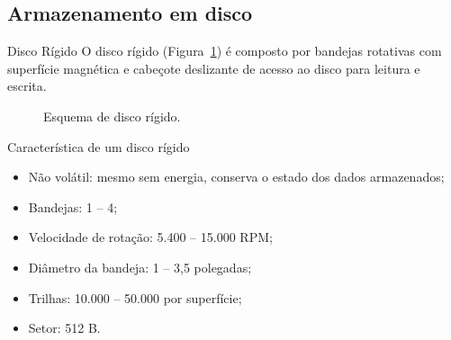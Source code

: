 

\subsection{Armazenamento em disco}

\begin{frame}{Disco Rígido}
O disco rígido (Figura~\ref{fig:hd}) é composto por bandejas rotativas
com superfície magnética e cabeçote deslizante de acesso ao disco para
leitura e escrita.

  \begin{figure}[h]
  \centering

\label{fig:hd}
\caption{Esquema de disco rígido.}
\end{figure}
\end{frame}

\begin{frame}{Característica de um disco rígido}
\begin{itemize}
\item Não volátil: mesmo sem energia, conserva o estado dos dados armazenados;
\item Bandejas: 1 -- 4;
\item Velocidade de rotação: 5.400 -- 15.000 RPM;
\item Diâmetro da bandeja: 1 -- 3,5 polegadas;
\item Trilhas: 10.000 -- 50.000 por superfície;
\item Setor: 512 B.
\end{itemize}
\end{frame}


